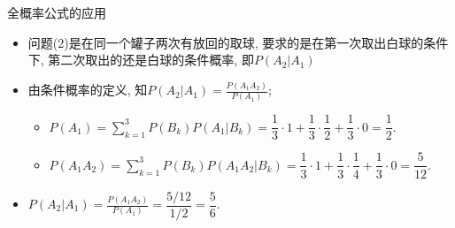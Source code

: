 \begin{frame}{全概率公式的应用}
	\begin{itemize}[<+-|alert@+>]
	\item 问题(2)是在同一个罐子两次有放回的取球, 要求的是在第一次取出白球的条件下, 第二次取出的还是白球的条件概率, 即$P(A_2|A_1)$
	\item 由条件概率的定义, 知\pause $P(A_2|A_1)=\frac{P(A_1A_2)}{P(A_1)}$;\pause %
	\begin{itemize}[<+-|alert@+>]
		\item $P(A_1)=\sum\limits_{k=1}^{3}P(B_k)P(A_1|B_k)=\dfrac{1}{3}·1+\dfrac{1}{3}·\dfrac{1}{2}+\dfrac{1}{3}·0=\dfrac{1}{2}.$
		\item $P(A_1A_2)=\sum\limits_{k=1}^{3}P(B_k)P(A_1A_2|B_k)=\dfrac{1}{3}·1+\dfrac{1}{3}·\dfrac{1}{4}+\dfrac{1}{3}·0=\dfrac{5}{12}.$
	\end{itemize}
	\item 	$P(A_2|A_1)=\frac{P(A_1A_2)}{P(A_1)}=\dfrac{5/12}{1/2}=\dfrac{5}{6}.$
\end{itemize}
\end{frame}
